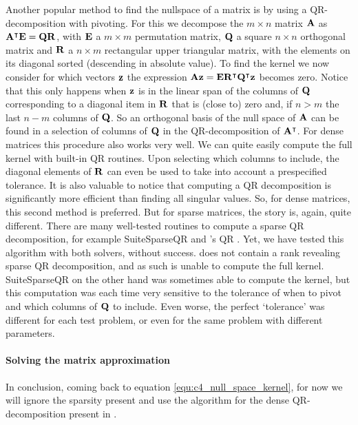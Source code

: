 Another popular \cite{trefethen_numerical_1997} method to find the nullspace of a matrix is by using a QR-decomposition with pivoting. For this we decompose the $m \times n$ matrix $\vb{A}$ as ${\vb{A}}^\intercal\vb{E} = \vb{Q} \vb{R}$, with $\vb{E}$ a $m\times m$ permutation matrix, $\vb{Q}$ a square $n \times n$ orthogonal matrix and $\vb{R}$ a $n \times m$ rectangular upper triangular matrix, with the elements on its diagonal sorted (descending in absolute value). To find the kernel we now consider for which vectors $\vb{z}$ the expression $\vb{A} \vb{z} = \vb{E}{\vb{R}}^\intercal{\vb{Q}}^\intercal\vb{z}$ becomes zero. Notice that this only happens when $\vb{z}$ is in the linear span of the columns of $\vb{Q}$ corresponding to a diagonal item in $\vb{R}$ that is (close to) zero and, if $n > m$ the last $n - m$ columns of $\vb{Q}$. So an orthogonal basis of the null space of $\vb{A}$ can be found in a selection of columns of $\vb{Q}$ in the QR-decomposition of ${\vb{A}}^\intercal$. For dense matrices this procedure also works very well. We can quite easily compute the full kernel with built-in QR routines. Upon selecting which columns to include, the diagonal elements of $\vb{R}$ can even be used to take into account a prespecified tolerance. It is also valuable to notice that computing a QR decomposition is significantly more efficient than finding all singular values. So, for dense matrices, this second method is preferred. But for sparse matrices, the story is, again, quite different. There are many well-tested routines to compute a sparse QR decomposition, for example SuiteSparseQR \cite{davis_algorithm_2011} and \Eigen{}'s QR \cite{guennebaud_eigen_2010}. Yet, we have tested this algorithm with both solvers, without success. \Eigen{} does not contain a rank revealing sparse QR decomposition, and as such is unable to compute the full kernel. SuiteSparseQR on the other hand was sometimes able to compute the kernel, but this computation was each time very sensitive to the tolerance of when to pivot and which columns of $\vb{Q}$ to include. Even worse, the perfect `tolerance' was different for each test problem, or even for the same problem with different parameters.

\paragraph{Solving the matrix approximation}
In conclusion, coming back to equation \eqref{equ:c4_null_space_kernel}, for now we will ignore the sparsity present and use the algorithm for the dense QR-decomposition present in \Eigen{} \cite{guennebaud_eigen_2010}.

